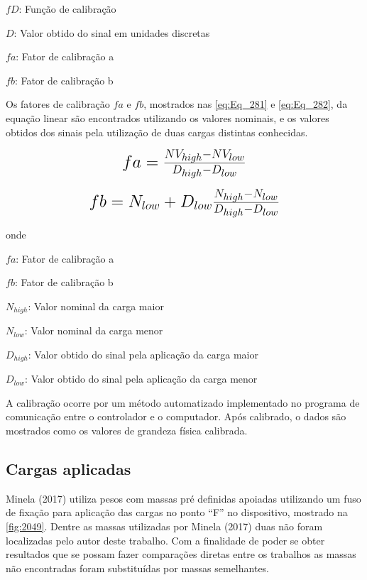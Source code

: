 $f{D}$: Função de calibração

$D$: Valor obtido do sinal em unidades discretas

$fa$: Fator de calibração a

$fb$: Fator de calibração b

\hfill


Os fatores de calibração $ fa $ e $ fb $, mostrados nas \autoref{eq:Eq_281} e \autoref{eq:Eq_282}, da equação linear são encontrados utilizando os valores nominais, e os valores obtidos
dos sinais pela utilização de duas cargas distintas conhecidas.

\begin{equation}\label{eq:Eq_281}%
\mbox{\fontsize{17.28}{21.6}\selectfont\( %
fa = \frac{NV_{high} - NV_{low}}{D_{high} - D_{low}}
\)} %
\end{equation}

\begin{equation}\label{eq:Eq_282}%
\mbox{\fontsize{17.28}{21.6}\selectfont\( %
fb = N_{low} + D_{low} \frac{N_{high} - N_{low}}{D_{high} - D_{low}}
\)} %
\end{equation}

onde

$fa$: Fator de calibração a

$fb$: Fator de calibração b

$N_{high}$: Valor nominal da carga maior

$N_{low}$: Valor nominal da carga menor

$D_{high}$: Valor obtido do sinal pela aplicação da carga maior

$D_{low}$: Valor obtido do sinal pela aplicação da carga menor

\hfill

A calibração ocorre por um método automatizado implementado no programa de comunicação entre o controlador e o computador.
Após calibrado, o dados são mostrados como os valores de grandeza física calibrada.

\subsection{Cargas aplicadas}

Minela (2017) utiliza pesos com massas pré definidas apoiadas utilizando um fuso de fixação para aplicação das cargas no ponto “F” no dispositivo, mostrado na \autoref{fig:2049}.
Dentre as massas utilizadas por Minela (2017) duas não foram localizadas pelo autor deste trabalho.
Com a finalidade de poder se obter resultados que se possam fazer comparações diretas entre os trabalhos as massas não encontradas foram substituídas por massas semelhantes.

